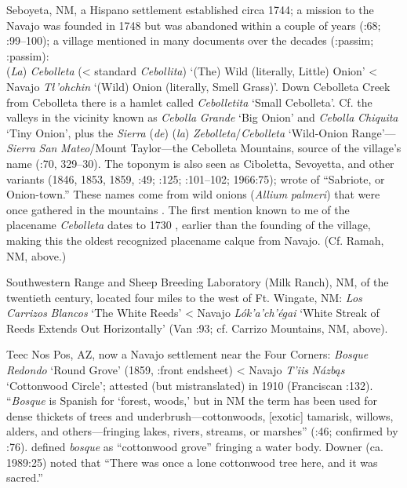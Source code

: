 Seboyeta, NM, a Hispano settlement established circa 1744; a mission to the Navajo was founded in 1748 but was abandoned within a couple of years (\citealt{Beers1979}:68; \citealt{Acrey1988}:99–100); a village mentioned in many documents over the decades (\citealt{Correll1979}:passim; \citealt{Eidenbach2012}:passim):  \\
(\textit{La}) \textit{Cebolleta} (< standard \textit{Cebollita}) ‘(The) Wild (literally, Little) Onion’ < Navajo \textit{Tł'ohchin} ‘(Wild) Onion (literally, Smell Grass)’.  Down Cebolleta Creek from Cebolleta there is a hamlet called \textit{Cebolletita} ‘Small Cebolleta’.  Cf. the valleys in the vicinity known as \textit{Cebolla} \textit{Grande} ‘Big Onion’ and \textit{Cebolla} \textit{Chiquita} ‘Tiny Onion’, plus the \textit{Sierra} (\textit{de}) (\textit{la}) \textit{Zebolleta}/\textit{Cebolleta} ‘Wild-Onion Range’—\textit{Sierra} \textit{San} \textit{Mateo}/Mount Taylor—the Cebolleta Mountains, source of the village’s name (\citealt{Julyan1998}:70, 329–30).  The toponym is also seen as Ciboletta, Sevoyetta, and other variants (1846, 1853, 1859, \citealt{Abert1848}:49; \citealt{Foreman1941}:125; \citealt{Bailey1964a}:101–102; 1966:75); \citet[27]{Robinson1848} wrote of “Sabriote, or Onion-town.”  These names come from wild onions (\textit{Allium} \textit{palmeri}) that were once gathered in the mountains \citep[27]{McNitt1972}.  The first mention known to me of the placename \textit{Cebolleta} dates to 1730 \citep[307]{Reeve1956}, earlier than the founding of the village, making this the oldest recognized placename calque from Navajo.  (Cf. Ramah, NM, above.)

Southwestern Range and Sheep Breeding Laboratory (Milk Ranch), NM, of the twentieth century, located four miles to the west of Ft. Wingate, NM:  \textit{Los} \textit{Carrizos} \textit{Blancos} ‘The White Reeds’ < Navajo \textit{Lók’a’ch’égai} ‘White Streak of Reeds Extends Out Horizontally’ (Van \citealt{ValkenburghWalker1945}:93; cf. Carrizo Mountains, NM, above).

Teec Nos Pos, AZ, now a Navajo settlement near the Four Corners:  \textit{Bosque} \textit{Redondo} ‘Round Grove’ (1859, \citealt{Bailey1964a}:front endsheet) < Navajo \textit{T'iis} \textit{Názbąs} ‘Cottonwood Circle’; attested (but mistranslated) in 1910 (Franciscan \citealt{Fathers1910}:132).  “\textit{Bosque} is Spanish for ‘forest, woods,’ but in NM the term has been used for dense thickets of trees and underbrush—cottonwoods, [exotic] tamarisk, willows, alders, and others—fringing lakes, rivers, streams, or marshes” (\citealt{Julyan1998}:46; confirmed by \citealt{Studerus2001}:76).  \citet[20]{Cobos1983} defined \textit{bosque} as “cottonwood grove” fringing a water body.  Downer (ca. 1989:25) noted that “There was once a lone cottonwood tree here, and it was sacred.”

